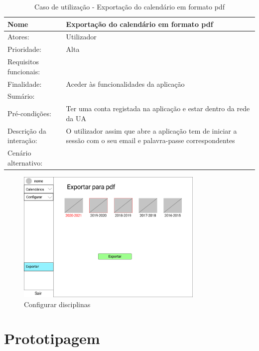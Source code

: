 \documentclass[11pt, twoside]{report}
\begin{document}
	
\begin{table}[H]
	\caption{Caso de utilização - Exportação do calendário em formato pdf}
	\begin{center}	
		\begin{tabularx}{\textwidth}{|l|X|}
			\hline
			\textbf{Nome }	& \textbf{Exportação do calendário em formato pdf} \\
			\hline
			Atores: & Utilizador \\
			\hline
			Prioridade: & Alta \\
			\hline
			Requisitos funcionais:&  \\
			\hline
			Finalidade: & Aceder às funcionalidades da aplicação\\
			\hline
			Sumário: &  \\
			\hline
			Pré-condições: & Ter uma conta registada na aplicação e estar dentro da rede da UA\\
			\hline
			Descrição da interação: &  O utilizador assim que abre a aplicação tem de iniciar a sessão com o seu email e palavra-passe correspondentes\\
			\hline
			Cenário alternativo:&\\
			\hline
		\end{tabularx}
	\end{center}
\end{table}

	\begin{figure}[H] 
	\centering 
	\includegraphics[width=0.8\textwidth,height=0.8\textheight,keepaspectratio]{image/prototipowireframes/exportarpdf}
	\caption{Configurar disciplinas}
\end{figure}
	
	\chapter{Prototipagem}
\end{document}
